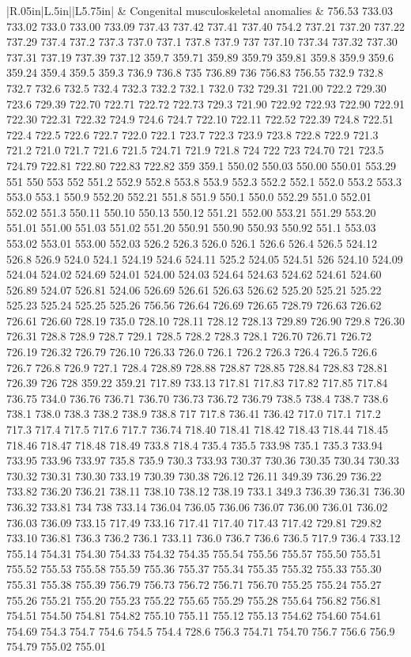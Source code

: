 \begin{longtable}{|R{.05in}|L{.5in}||L{5.75in}|}
    & Congenital musculoskeletal anomalies &  756.53 733.03 733.02 733.0 733.00 733.09 737.43 737.42 737.41 737.40 754.2 737.21 737.20 737.22 737.29 737.4 737.2 737.3 737.0 737.1 737.8 737.9 737 737.10 737.34 737.32 737.30 737.31 737.19 737.39 737.12 359.7 359.71 359.89 359.79 359.81 359.8 359.9 359.6 359.24 359.4 359.5 359.3 736.9 736.8 735 736.89 736 756.83 756.55 732.9 732.8 732.7 732.6 732.5 732.4 732.3 732.2 732.1 732.0 732 729.31 721.00 722.2 729.30 723.6 729.39 722.70 722.71 722.72 722.73 729.3 721.90 722.92 722.93 722.90 722.91 722.30 722.31 722.32 724.9 724.6 724.7 722.10 722.11 722.52 722.39 724.8 722.51 722.4 722.5 722.6 722.7 722.0 722.1 723.7 722.3 723.9 723.8 722.8 722.9 721.3 721.2 721.0 721.7 721.6 721.5 724.71 721.9 721.8 724 722 723 724.70 721 723.5 724.79 722.81 722.80 722.83 722.82 359 359.1 550.02 550.03 550.00 550.01 553.29 551 550 553 552 551.2 552.9 552.8 553.8 553.9 552.3 552.2 552.1 552.0 553.2 553.3 553.0 553.1 550.9 552.20 552.21 551.8 551.9 550.1 550.0 552.29 551.0 552.01 552.02 551.3 550.11 550.10 550.13 550.12 551.21 552.00 553.21 551.29 553.20 551.01 551.00 551.03 551.02 551.20 550.91 550.90 550.93 550.92 551.1 553.03 553.02 553.01 553.00 552.03 526.2 526.3 526.0 526.1 526.6 526.4 526.5 524.12 526.8 526.9 524.0 524.1 524.19 524.6 524.11 525.2 524.05 524.51 526 524.10 524.09 524.04 524.02 524.69 524.01 524.00 524.03 524.64 524.63 524.62 524.61 524.60 526.89 524.07 526.81 524.06 526.69 526.61 526.63 526.62 525.20 525.21 525.22 525.23 525.24 525.25 525.26 756.56 726.64 726.69 726.65 728.79 726.63 726.62 726.61 726.60 728.19 735.0 728.10 728.11 728.12 728.13 729.89 726.90 729.8 726.30 726.31 728.8 728.9 728.7 729.1 728.5 728.2 728.3 728.1 726.70 726.71 726.72 726.19 726.32 726.79 726.10 726.33 726.0 726.1 726.2 726.3 726.4 726.5 726.6 726.7 726.8 726.9 727.1 728.4 728.89 728.88 728.87 728.85 728.84 728.83 728.81 726.39 726 728 359.22 359.21 717.89 733.13 717.81 717.83 717.82 717.85 717.84 736.75 734.0 736.76 736.71 736.70 736.73 736.72 736.79 738.5 738.4 738.7 738.6 738.1 738.0 738.3 738.2 738.9 738.8 717 717.8 736.41 736.42 717.0 717.1 717.2 717.3 717.4 717.5 717.6 717.7 736.74 718.40 718.41 718.42 718.43 718.44 718.45 718.46 718.47 718.48 718.49 733.8 718.4 735.4 735.5 733.98 735.1 735.3 733.94 733.95 733.96 733.97 735.8 735.9 730.3 733.93 730.37 730.36 730.35 730.34 730.33 730.32 730.31 730.30 733.19 730.39 730.38 726.12 726.11 349.39 736.29 736.22 733.82 736.20 736.21 738.11 738.10 738.12 738.19 733.1 349.3 736.39 736.31 736.30 736.32 733.81 734 738 733.14 736.04 736.05 736.06 736.07 736.00 736.01 736.02 736.03 736.09 733.15 717.49 733.16 717.41 717.40 717.43 717.42 729.81 729.82 733.10 736.81 736.3 736.2 736.1 733.11 736.0 736.7 736.6 736.5 717.9 736.4 733.12 755.14 754.31 754.30 754.33 754.32 754.35 755.54 755.56 755.57 755.50 755.51 755.52 755.53 755.58 755.59 755.36 755.37 755.34 755.35 755.32 755.33 755.30 755.31 755.38 755.39 756.79 756.73 756.72 756.71 756.70 755.25 755.24 755.27 755.26 755.21 755.20 755.23 755.22 755.65 755.29 755.28 755.64 756.82 756.81 754.51 754.50 754.81 754.82 755.10 755.11 755.12 755.13 754.62 754.60 754.61 754.69 754.3 754.7 754.6 754.5 754.4 728.6 756.3 754.71 754.70 756.7 756.6 756.9 754.79 755.02 755.01 
\end{longtable}

